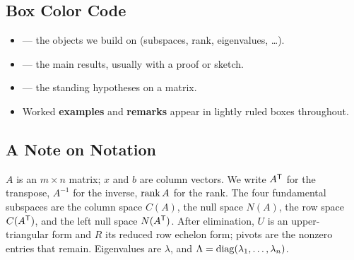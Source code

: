 \documentclass[oneside]{book}
\begin{document}
\subsection*{Box Color Code}

\begin{itemize}
    \item {} --- the objects we build on (subspaces, rank, eigenvalues, \dots).
    \item {} --- the main results, usually with a proof or sketch.
    \item {} --- the standing hypotheses on a matrix.
    \item Worked \textbf{examples} and \textbf{remarks} appear in lightly ruled boxes throughout.
\end{itemize}

\subsection*{A Note on Notation}

$A$ is an $m\times n$ matrix; $x$ and $b$ are column vectors. We write $A^{\mathsf T}$ for the transpose, $A^{-1}$ for the inverse, $\operatorname{rank} A$ for the rank. The four fundamental subspaces are the column space $C(A)$, the null space $N(A)$, the row space $C(A^{\mathsf T})$, and the left null space $N(A^{\mathsf T})$. After elimination, $U$ is an upper-triangular form and $R$ its reduced row echelon form; pivots are the nonzero entries that remain. Eigenvalues are $\lambda$, and $\Lambda=\operatorname{diag}(\lambda_1,\dots,\lambda_n)$.

\newpage

\setcounter{tocdepth}{1}
\tableofcontents
\newpage











\end{document}
